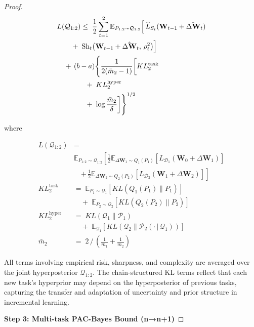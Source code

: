\documentclass[letterpaper]{article} %
\begin{document}
\begin{proof}
\begin{align}
& L(\mathcal{Q}_{1:2}) \leq\;  \frac{1}{2} \sum_{t=1}^2 
    \mathbb{E}_{P_{1:2} \sim \mathcal{Q}_{1:2}} 
    \Big[\, 
        \widehat{L}_{S_t}(\mathbf{W}_{t-1} + \hat{\Delta\mathbf{W}}_t) \notag \\
&\qquad
    +\; \mathrm{Sh}_t\big(\mathbf{W}_{t-1} + \hat{\Delta\mathbf{W}}_t,\, \rho_t^2\big)
    \Big] \notag \\
&\quad
    +\, (b-a)\Bigg\{ \frac{1}{2(\bar{m}_2 - 1)} \bigg[
            KL^{\text{task}}_2 \notag \\
&\qquad\qquad
            +\; KL^{\text{hyper}}_2 \notag \\
&\qquad\qquad
            +\; \log\frac{\bar{m}_2}{\delta}
        \bigg] \Bigg\}^{1/2}
\end{align}


where 


\begin{align*}
L(\mathcal{Q}_{1:2}) &= \\
&\mathbb{E}_{P_{1:2} \sim \mathcal{Q}_{1:2}} 
\left[
    \frac{1}{2} \mathbb{E}_{\Delta\mathbf{W}_1 \sim Q_1(P_1)} 
    \left[
        L_{\mathcal{D}_1}(\mathbf{W}_0 + \Delta\mathbf{W}_1)
    \right] \right.\\
&\quad \left.
    +\, \frac{1}{2} \mathbb{E}_{\Delta\mathbf{W}_2 \sim Q_2(P_2)} 
    \left[
        L_{\mathcal{D}_2}(\mathbf{W}_1 + \Delta\mathbf{W}_2)
    \right]
\right] \\
KL^{\text{task}}_2 &=\; 
    \mathbb{E}_{P_1 \sim \mathcal{Q}_1}\left[ KL(Q_1(P_1)\|P_1) \right] \\
& \quad +\; \mathbb{E}_{P_2 \sim \mathcal{Q}_2}\left[ KL(Q_2(P_2)\|P_2) \right] \\[1.2ex]
KL^{\text{hyper}}_2 &=\; 
    KL(\mathcal{Q}_1\|\mathcal{P}_1) \\
& \quad +\; \mathbb{E}_{\mathcal{Q}_1}\left[ KL(\mathcal{Q}_2 \| \mathcal{P}_2(\cdot\,|\,\mathcal{Q}_1)) \right] \\
\bar{m}_2 &=\;  2\, /\, \left(\frac{1}{m_1} + \frac{1}{m_2}\right)
\end{align*}


 All terms involving empirical risk, sharpness, and complexity are averaged over the joint hyperposterior $\mathcal{Q}_{1:2}$. The chain-structured KL terms reflect that each new task's hyperprior may depend on the hyperposterior of previous tasks, capturing the transfer and adaptation of uncertainty and prior structure in incremental learning.


\textbf{Step 3: Multi-task PAC-Bayes Bound (n→n+1)}


\end{proof}
\end{document}
